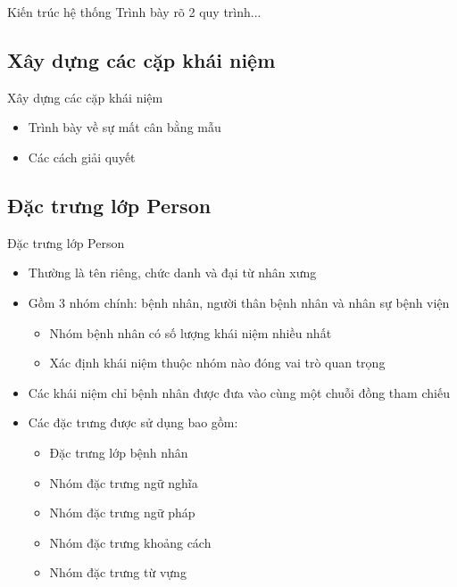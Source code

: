 \begin{frame}{Kiến trúc hệ thống}
\putlogo
Trình bày rõ 2 quy trình...
\end{frame}

\subsection{Xây dựng các cặp khái niệm}
\begin{frame}{Xây dựng các cặp khái niệm}
\putlogo
\begin{itemize}
\item Trình bày về sự mất cân bằng mẫu
\item Các cách giải quyết
\end{itemize}
\end{frame}

\subsection{Đặc trưng lớp Person}
\begin{frame}{Đặc trưng lớp Person}
\putlogo
\begin{itemize}
	\item Thường là tên riêng, chức danh và đại từ nhân xưng
	\item Gồm 3 nhóm chính: bệnh nhân, người thân bệnh nhân và nhân sự bệnh viện
	\begin{itemize}
		\item Nhóm bệnh nhân có số lượng khái niệm nhiều nhất
		\item Xác định khái niệm thuộc nhóm nào đóng vai trò quan trọng
	\end{itemize}
	\item Các khái niệm chỉ bệnh nhân được đưa vào cùng một chuỗi đồng tham chiếu
	\item Các đặc trưng được sử dụng bao gồm:
	\begin{itemize}
		\item Đặc trưng lớp bệnh nhân
		\item Nhóm đặc trưng ngữ nghĩa
		\item Nhóm đặc trưng ngữ pháp
		\item Nhóm đặc trưng khoảng cách
		\item Nhóm đặc trưng từ vựng
	\end{itemize}
\end{itemize}
\end{frame}

